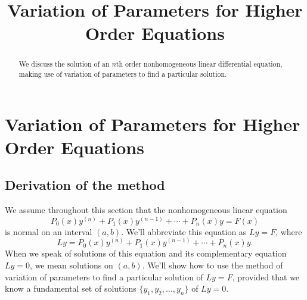 \documentclass{ximera}
\title{Variation of Parameters for Higher Order Equations}%
\begin{document}
\begin{abstract}
We discuss the solution of an $n$th order nonhomogeneous linear differential equation, making use of variation of parameters to find a particular solution.
\end{abstract}

\maketitle

\section*{Variation of Parameters for Higher Order Equations}

\subsection*{Derivation of the method}

We assume throughout this section that the nonhomogeneous linear equation
\begin{equation} \label{eq:9.4.1}
P_0(x)y^{(n)}+P_1(x)y^{(n-1)}+\cdots+P_n(x)y=F(x)
\end{equation}
is normal on an interval $(a,b)$. We'll abbreviate this equation as
$Ly=F$, where
$$
Ly=P_0(x)y^{(n)}+P_1(x)y^{(n-1)}+\cdots+P_n(x)y.
$$
When we speak of solutions of this equation and its complementary
equation $Ly=0$, we mean solutions on $(a,b)$. We'll show how to use
the method of variation of parameters to find a particular solution of
$Ly=F$, provided that we know a fundamental set of solutions
$\{y_1,y_2,\dots,y_n\}$ of $Ly=0$.
\end{document}
